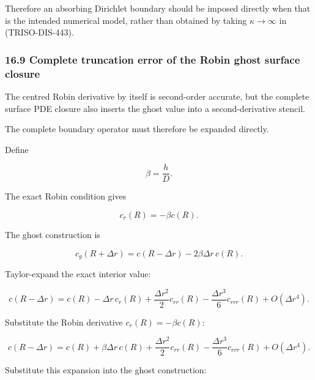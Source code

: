 \documentclass[11pt,a4paper]{article}
\begin{document}
Therefore an absorbing Dirichlet boundary should be imposed directly when that is the intended numerical model, rather than obtained by taking $\kappa\to\infty$ in (TRISO-DIS-443).

\subsubsection*{16.9 Complete truncation error of the Robin ghost surface closure}

The centred Robin derivative by itself is second-order accurate, but the complete surface PDE closure also inserts the ghost value into a second-derivative stencil.

The complete boundary operator must therefore be expanded directly.

Define

\begin{equation}
\beta=\frac{h}{D}.
\tag{TRISO-DIS-452}
\label{eq:triso-dis-452}
\end{equation}

The exact Robin condition gives

\begin{equation}
c_r(R)=-\beta c(R).
\tag{TRISO-DIS-453}
\label{eq:triso-dis-453}
\end{equation}

The ghost construction is

\begin{equation}
c_g(R+\Delta r)
=
c(R-\Delta r)
-
2\beta\Delta r\,c(R).
\tag{TRISO-DIS-454}
\label{eq:triso-dis-454}
\end{equation}

Taylor-expand the exact interior value:

\begin{equation}
c(R-\Delta r)
=
c(R)
-
\Delta r\,c_r(R)
+
\frac{\Delta r^2}{2}c_{rr}(R)
-
\frac{\Delta r^3}{6}c_{rrr}(R)
+
O(\Delta r^4).
\tag{TRISO-DIS-455}
\label{eq:triso-dis-455}
\end{equation}

Substitute the Robin derivative $c_r(R)=-\beta c(R)$:

\begin{equation}
c(R-\Delta r)
=
c(R)
+
\beta\Delta r\,c(R)
+
\frac{\Delta r^2}{2}c_{rr}(R)
-
\frac{\Delta r^3}{6}c_{rrr}(R)
+
O(\Delta r^4).
\tag{TRISO-DIS-456}
\label{eq:triso-dis-456}
\end{equation}

Substitute this expansion into the ghost construction:
\end{document}
